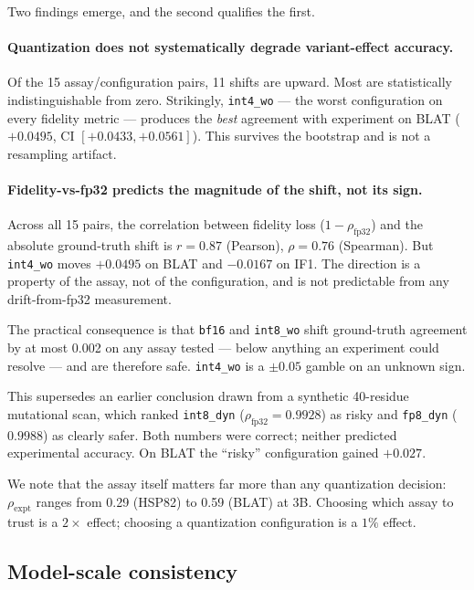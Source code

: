 \documentclass[11pt]{article}
\newcommand{\cfg}[1]{\texttt{#1}}
\begin{document}
Two findings emerge, and the second qualifies the first.

\paragraph{Quantization does not systematically degrade variant-effect
accuracy.} Of the 15 assay/configuration pairs, 11 shifts are upward. Most are
statistically indistinguishable from zero. Strikingly, \cfg{int4\_wo} --- the
worst configuration on every fidelity metric --- produces the \emph{best}
agreement with experiment on BLAT ($+0.0495$, CI $[+0.0433, +0.0561]$). This
survives the bootstrap and is not a resampling artifact.

\paragraph{Fidelity-vs-fp32 predicts the magnitude of the shift, not its sign.}
Across all 15 pairs, the correlation between fidelity loss
($1 - \rho_{\text{fp32}}$) and the absolute ground-truth shift is
$r = 0.87$ (Pearson), $\rho = 0.76$ (Spearman). But \cfg{int4\_wo} moves
$+0.0495$ on BLAT and $-0.0167$ on IF1. The direction is a property of the
assay, not of the configuration, and is not predictable from any
drift-from-fp32 measurement.

The practical consequence is that \cfg{bf16} and \cfg{int8\_wo} shift
ground-truth agreement by at most 0.002 on any assay tested --- below anything
an experiment could resolve --- and are therefore safe. \cfg{int4\_wo} is a
$\pm 0.05$ gamble on an unknown sign.

This supersedes an earlier conclusion drawn from a synthetic 40-residue mutational
scan, which ranked \cfg{int8\_dyn} ($\rho_{\text{fp32}} = 0.9928$) as risky and
\cfg{fp8\_dyn} ($0.9988$) as clearly safer. Both numbers were correct; neither
predicted experimental accuracy. On BLAT the ``risky'' configuration gained
$+0.027$.

We note that the assay itself matters far more than any quantization decision:
$\rho_{\text{expt}}$ ranges from 0.29 (HSP82) to 0.59 (BLAT) at 3B. Choosing
which assay to trust is a $2\times$ effect; choosing a quantization
configuration is a $1\%$ effect.

\subsection{Model-scale consistency}
\label{sec:pilotscale}
\end{document}
